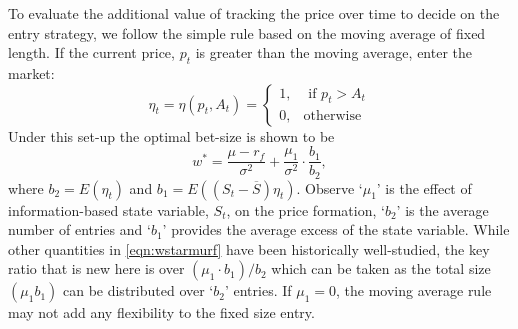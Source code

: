 To evaluate the additional value of tracking the price over time to decide on the entry strategy, we follow the simple rule based on the moving average of fixed length. If the current price, $p_t$ is greater than the moving average, enter the market:
	\begin{equation}\label{eqn:etatetapt}
	\eta_t= \eta(p_t,A_t)= \begin{cases}
	1, & \text{ if } p_t > A_t \\
	0, & \text{otherwise}
	\end{cases}
	\end{equation}
Under this set-up the optimal bet-size is shown to be
	\begin{equation}\label{eqn:wstarmurf}
	w^*= \dfrac{\mu - r_f}{\sigma^2} + \dfrac{\mu_1}{\sigma^2} \cdot \dfrac{b_1}{b_2},
	\end{equation}
where $b_2=E(\eta_t)$ and $b_1=E((S_t - \overline{S}) \eta_t)$. Observe `$\mu_1$' is the effect of information-based state variable, $S_t$, on the price formation, `$b_2$' is the average number of entries and `$b_1$' provides the average excess of the state variable. While other quantities in \eqref{eqn:wstarmurf} have been historically well-studied, the key ratio that is new here is over $(\mu_1 \cdot b_1)/b_2$ which can be taken as the total size $(\mu_1 b_1)$ can be distributed over `$b_2$' entries. If $\mu_1= 0$, the moving average rule may not add any flexibility to the fixed size entry. 